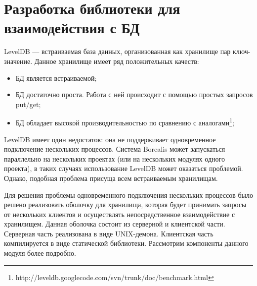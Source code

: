 \section{Разработка библиотеки для взаимодействия с БД}
LevelDB\cite{leveldb} --- встраиваемая база данных, организованная как хранилище пар ключ-значение. Данное хранилище имеет ряд положительных качеств:
\begin{itemize}
\item БД является встраиваемой;
\item БД достаточно проста. Работа с ней происходит с помощью простых запросов put/get;
\item БД обладает высокой производительностью по сравнению с аналогами\footnote{http://leveldb.googlecode.com/svn/trunk/doc/benchmark.html};
\end{itemize}

LevelDB имеет один недостаток: она не поддерживает одновременное подключение нескольких процессов. Система Borealis может запускаться параллельно на нескольких проектах (или на нескольких модулях одного проекта), в таких случаях использование LevelDB может оказаться проблемой. Однако, подобная проблема присуща всем встраиваемым хранилищам.

Для решения проблемы одновременного подключения нескольких процессов было решено реализовать оболочку для хранилища, которая будет принимать запросы от нескольких клиентов и осуществлять непосредственное взаимодействие с хранилищем. Данная оболочка состоит из серверной и клиентской части. Серверная часть реализована в виде UNIX-демона. Клиентская часть компилируется в виде статической библиотеки. Рассмотрим компоненты данного модуля более подробно.

